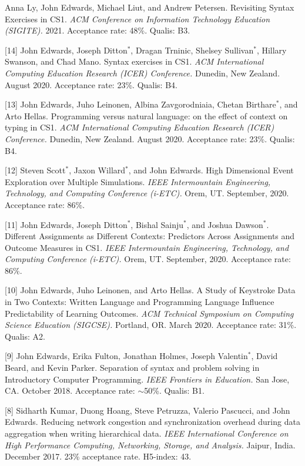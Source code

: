 \documentclass[margin,line]{res}
\newcommand{\pubunder}[1]{#1}
\newcommand{\cnum}[1]{[#1]}
\begin{document}
\begin{resume}
\cnum{15} Anna Ly, John Edwards, Michael Liut, and Andrew Petersen. Revisiting Syntax Exercises in CS1. \textit{ACM Conference on Information Technology Education (SIGITE).} 2021. Acceptance rate: 48\%. Qualis: B3.

\cnum{14} John Edwards, Joseph Ditton$^*$, Dragan Trninic, Shelsey Sullivan$^*$, Hillary Swanson, and Chad Mano. Syntax exercises in CS1. \textit{ACM International Computing Education Research (ICER) Conference.} Dunedin, New Zealand. August 2020. Acceptance rate: 23\%. Qualis: B4.

\cnum{13} John Edwards, Juho Leinonen, Albina Zavgorodniaia, Chetan Birthare$^*$, and Arto Hellas. Programming versus natural language: on the effect of context on typing in CS1. \textit{ACM International Computing Education Research (ICER) Conference.} Dunedin, New Zealand. August 2020. Acceptance rate: 23\%. Qualis: B4.

\cnum{12} Steven Scott$^*$, Jaxon Willard$^*$, and \pubunder{John Edwards}. High Dimensional Event Exploration over Multiple Simulations. \textit{IEEE Intermountain Engineering, Technology, and Computing Conference (i-ETC).} Orem, UT. September, 2020. Acceptance rate: 86\%.

\cnum{11} John Edwards, Joseph Ditton$^*$, Bishal Sainju$^*$, and Joshua Dawson$^*$. Different Assignments as Different Contexts: Predictors Across Assignments and Outcome Measures in CS1. \textit{IEEE Intermountain Engineering, Technology, and Computing Conference (i-ETC).} Orem, UT. September, 2020. Acceptance rate: 86\%.

\cnum{10} John Edwards, Juho Leinonen, and Arto Hellas. A Study of Keystroke Data in Two Contexts: Written Language and Programming Language Influence Predictability of Learning Outcomes.  \textit{ACM Technical Symposium on Computing Science Education (SIGCSE).} Portland, OR. March 2020.  Acceptance rate: 31\%. Qualis: A2.

\cnum{9} John Edwards, Erika Fulton, Jonathan Holmes, Joseph Valentin$^*$, David Beard, and Kevin Parker. Separation of syntax and problem solving in Introductory Computer Programming. \textit{IEEE Frontiers in Education.} San Jose, CA. October 2018.  Acceptance rate: $\sim$50\%. Qualis: B1.

\cnum{8} Sidharth Kumar, Duong Hoang, Steve Petruzza, Valerio Pascucci, and \pubunder{John Edwards}. Reducing network congestion and synchronization overhead during data aggregation when writing hierarchical data. \textit{IEEE International Conference on High Performance Computing, Networking, Storage, and Analysis.} Jaipur, India. December 2017. 23\% acceptance rate. H5-index: 43.


\end{resume}
\end{document}
